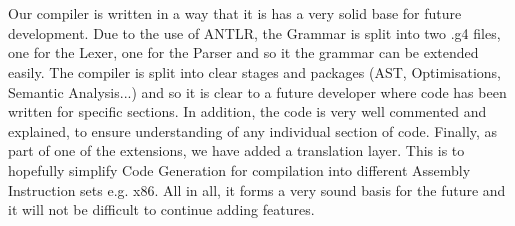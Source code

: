 \documentclass[5pt]{article}
\begin{document}
\\ \\
Our compiler is written in a way that it is has a very solid base for future development. Due to the use of ANTLR, the Grammar is split into two .g4 files, one for the Lexer, one for the Parser and so it the grammar can be extended easily. The compiler is split into clear stages and packages (AST, Optimisations, Semantic Analysis...) and so it is clear to a future developer where code has been written for specific sections. In addition, the code is very well commented and explained, to ensure understanding of any individual section of code. Finally, as part of one of the extensions, we have added a translation layer. This is to hopefully simplify Code Generation for compilation into different Assembly Instruction sets e.g. x86. All in all, it forms a very sound basis for the future and it will not be difficult to continue adding features.
\end{document}
